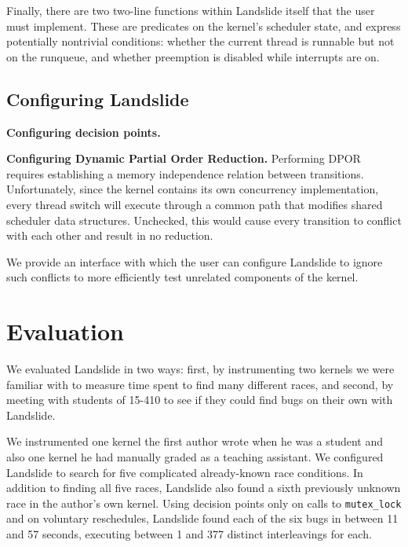 \documentclass{llncs}
\begin{document}

Finally, there are two two-line functions within Landslide itself that the user must implement. These are predicates on the kernel's scheduler state, and express potentially nontrivial conditions: whether the current thread is runnable but not on the runqueue, and whether preemption is disabled while interrupts are on.

\subsection{Configuring Landslide}
\label{sec:config}

{\bf Configuring decision points.} %

{\bf Configuring Dynamic Partial Order Reduction.} Performing DPOR requires establishing a memory independence relation between transitions.
Unfortunately, since the kernel contains its own concurrency implementation, every thread switch will execute through a common path that modifies shared scheduler data structures.
Unchecked, this would cause every transition to conflict with each other and result in no reduction.

We provide an interface with which the user can configure Landslide to ignore such conflicts to more efficiently test unrelated components of the kernel.

\section{Evaluation}

We evaluated Landslide in two ways: first, by instrumenting two kernels we were familiar with to measure time spent to find many different races, and second, by meeting with students of 15-410 to see if they could find bugs on their own with Landslide.

We instrumented one kernel the first author wrote when he was a student and also one kernel he had manually graded as a teaching assistant. We configured Landslide to search for five complicated already-known race conditions. In addition to finding all five races, Landslide also found a sixth previously unknown race in the author's own kernel. Using decision points only on calls to \texttt{mutex\_lock} and on voluntary reschedules, Landslide found each of the six bugs in between 11 and 57 seconds, executing between 1 and 377 distinct interleavings for each.
\end{document}
